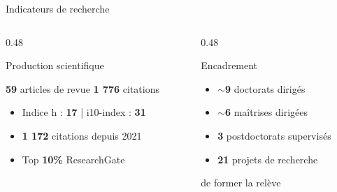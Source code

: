 \documentclass[aspectratio=169,11pt]{beamer}
\begin{document}
\begin{frame}{Indicateurs de recherche}
  \begin{columns}[T]
    \begin{column}{0.48\textwidth}
      \begin{block}{Production scientifique}
        \begin{center}
          {\Huge\textcolor{ushervert}{\textbf{59}}} {\small articles de revue}
          \hspace{0.3cm}
          {\Huge\textcolor{usheror}{\textbf{1 776}}} {\small citations}
        \end{center}
        \vspace{0.3em}
        \begin{itemize}
          \item Indice h : \textbf{17} | i10-index : \textbf{31}
          \item \textbf{1 172} citations depuis 2021
          \item Top \textbf{10\%} ResearchGate
        \end{itemize}
      \end{block}
    \end{column}
    \begin{column}{0.48\textwidth}
      \begin{block}{Encadrement}
        \begin{itemize}
          \item $\sim$\textbf{9} doctorats dirigés
          \item $\sim$\textbf{6} maîtrises dirigées
          \item \textbf{3} postdoctorats supervisés
          \item \textbf{21} projets de recherche
        \end{itemize}
        \vspace{0.5em}
         de former la relève
      \end{block}
    \end{column}
  \end{columns}
\end{frame}
\end{document}
